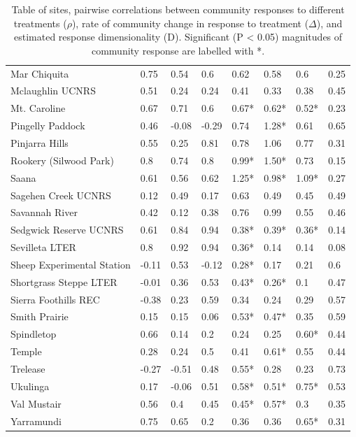 \documentclass[twoside,12pt,final]{ucthesis-CA2012}
\begin{document}
\begin{ucmainmatter}
\begin{table}[ht]
{\begin{tabular}{llllllll}
  Mar Chiquita & 0.75 & 0.54 & 0.6 & 0.62 & 0.58 & 0.6 & 0.25 \\ 
  Mclaughlin UCNRS & 0.51 & 0.24 & 0.24 & 0.41 & 0.33 & 0.38 & 0.45 \\ 
  Mt. Caroline & 0.67 & 0.71 & 0.6 & 0.67* & 0.62* & 0.52* & 0.23 \\ 
  Pingelly Paddock & 0.46 & -0.08 & -0.29 & 0.74 & 1.28* & 0.61 & 0.65 \\ 
  Pinjarra Hills & 0.55 & 0.25 & 0.81 & 0.78 & 1.06 & 0.77 & 0.31 \\ 
  Rookery (Silwood Park) & 0.8 & 0.74 & 0.8 & 0.99* & 1.50* & 0.73 & 0.15 \\ 
  Saana & 0.61 & 0.56 & 0.62 & 1.25* & 0.98* & 1.09* & 0.27 \\ 
  Sagehen Creek UCNRS & 0.12 & 0.49 & 0.17 & 0.63 & 0.49 & 0.45 & 0.49 \\ 
  Savannah River & 0.42 & 0.12 & 0.38 & 0.76 & 0.99 & 0.55 & 0.46 \\ 
  Sedgwick Reserve UCNRS & 0.61 & 0.84 & 0.94 & 0.38* & 0.39* & 0.36* & 0.14 \\ 
  Sevilleta LTER & 0.8 & 0.92 & 0.94 & 0.36* & 0.14 & 0.14 & 0.08 \\ 
  Sheep Experimental Station & -0.11 & 0.53 & -0.12 & 0.28* & 0.17 & 0.21 & 0.6 \\ 
  Shortgrass Steppe LTER & -0.01 & 0.36 & 0.53 & 0.43* & 0.26* & 0.1 & 0.47 \\ 
  Sierra Foothills REC & -0.38 & 0.23 & 0.59 & 0.34 & 0.24 & 0.29 & 0.57 \\ 
  Smith Prairie & 0.15 & 0.15 & 0.06 & 0.53* & 0.47* & 0.35 & 0.59 \\ 
  Spindletop & 0.66 & 0.14 & 0.2 & 0.24 & 0.25 & 0.60* & 0.44 \\ 
  Temple & 0.28 & 0.24 & 0.5 & 0.41 & 0.61* & 0.55 & 0.44 \\ 
  Trelease & -0.27 & -0.51 & 0.48 & 0.55* & 0.28 & 0.23 & 0.73 \\ 
  Ukulinga & 0.17 & -0.06 & 0.51 & 0.58* & 0.51* & 0.75* & 0.53 \\ 
  Val Mustair & 0.56 & 0.4 & 0.45 & 0.45* & 0.57* & 0.3 & 0.35 \\ 
  Yarramundi & 0.75 & 0.65 & 0.2 & 0.36 & 0.36 & 0.65* & 0.31 \\ 
   \hline
\end{tabular}
}
\caption{Table of sites, pairwise correlations between community responses to different treatments ($\rho$), rate of community change in response to treatment ($\Delta$), and estimated response dimensionality (D). Significant (P < 0.05) magnitudes of community response are labelled with *.} 

\end{table}
\end{ucmainmatter}
\end{document}
